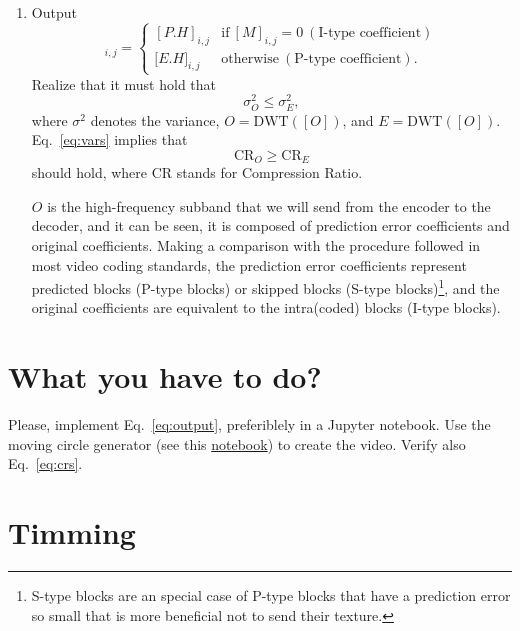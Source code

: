 \begin{enumerate}
\item Output
  \begin{equation}
    [O]_{i,j} = \left\{
      \begin{array}{ll}
        [P.H]_{i,j} & \text{if}~[M]_{i,j} = 0~(\text{I-type~coefficient})\\
        {[}E.H{]}_{i,j} & \text{otherwise}~(\text{P-type~coefficient}).
      \end{array}
    \right.
    \label{eq:output}
  \end{equation}
  Realize that it must hold that
  \begin{equation}
    \sigma^2_O \le \sigma^2_E,
    \label{eq:vars}
  \end{equation}
  where $\sigma^2$ denotes the variance, $O=\text{DWT}([O])$, and
  $E=\text{DWT}([O])$. Eq.~\ref{eq:vars} implies that
  \begin{equation}
    \text{CR}_O \ge \text{CR}_E
    \label{eq:crs}
  \end{equation}
  should hold, where CR stands for Compression Ratio.

  $O$ is the high-frequency subband that we will send from the
  encoder to the decoder, and it can be seen, it is composed of
  prediction error coefficients and original coefficients. Making a
  comparison with the procedure followed in most video coding
  standards, the prediction error coefficients represent predicted
  blocks (P-type blocks) or skipped blocks (S-type
  blocks)\footnote{S-type blocks are an special case of P-type blocks
  that have a prediction error so small that is more beneficial not to
  send their texture.}, and the original coefficients are equivalent
  to the intra(coded) blocks (I-type blocks).
\end{enumerate}

\section{What you have to do?}

Please, implement Eq.~\ref{eq:output}, preferiblely in a Jupyter
notebook. Use the moving circle generator (see
this \href{https://github.com/Sistemas-Multimedia/Sistemas-Multimedia.github.io/blob/master/milestones/11-MC_in_DWT_domain/DWT_shift_invariance.ipynb}{notebook})
to create the video. Verify also Eq.~\ref{eq:crs}.

\section{Timming}

